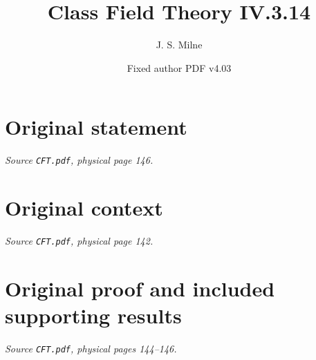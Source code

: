 \documentclass[11pt,a4paper]{article}
\title{Class Field Theory IV.3.14}
\author{J. S. Milne}
\date{Fixed author PDF v4.03}
\begin{document}
\maketitle
\section*{Original statement}
\noindent\emph{Source \texttt{CFT.pdf}, physical page 146.}\par\medskip

\section*{Original context}
\noindent\emph{Source \texttt{CFT.pdf}, physical page 142.}\par\medskip

\clearpage
\section*{Original proof and included supporting results}
\noindent\emph{Source \texttt{CFT.pdf}, physical pages 144--146.}\par\medskip

\end{document}
